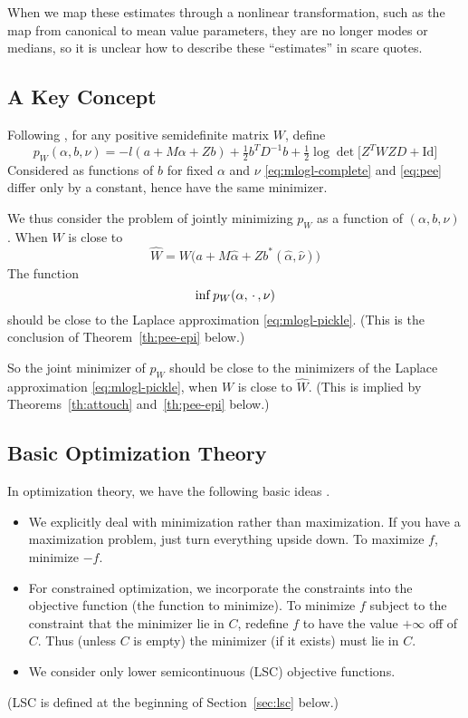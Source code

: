 When we map these estimates through a nonlinear transformation, such as the
map from canonical to mean value parameters,
they are no longer modes or medians, so it is unclear how to describe these
``estimates'' in scare quotes.

\subsection{A Key Concept}

Following \citet{reaster},
for any positive semidefinite matrix $W$, define
\begin{equation} \label{eq:pee}
   p_W(\alpha, b, \nu) =
   - l(a + M \alpha + Z b) + \tfrac{1}{2} b^T D^{-1} b
   + \tfrac{1}{2} \log \det \bigl[ Z^T W Z D + \text{Id}
   \bigr]
\end{equation}
Considered as functions of $b$ for fixed $\alpha$ and $\nu$
\eqref{eq:mlogl-complete} and \eqref{eq:pee} differ only by a constant,
hence have the same minimizer.

We thus consider the problem of jointly
minimizing $p_W$ as a function of $(\alpha, b, \nu)$.
When $W$ is close to
\begin{equation} \label{eq:w-hat}
   \widehat{W} =
   W\bigl(a + M \hat{\alpha} + Z b^*(\hat{\alpha}, \hat{\nu})\bigr)
\end{equation}
The function
$$
   \inf p_W(\alpha, \,\cdot\,, \nu)
$$
should be close to the Laplace approximation \eqref{eq:mlogl-pickle}.
(This is the conclusion of Theorem~\ref{th:pee-epi} below.)

So the joint minimizer of $p_W$ should be close to the minimizers
of the Laplace approximation \eqref{eq:mlogl-pickle},
when $W$ is close to $\hat{W}$.
(This is implied by Theorems~\ref{th:attouch} and~\ref{th:pee-epi} below.)

\subsection{Basic Optimization Theory}
\label{sec:basic}

In optimization theory, we have the following basic ideas
\citep[Sections~1.A, 1.B, and~1.C]{rockafellar-wets}.
\begin{itemize}
\item We explicitly deal with minimization rather than maximization.  If
    you have a maximization problem, just turn everything upside down.
    To maximize $f$, minimize $- f$.
\item For constrained optimization, we incorporate the constraints into
    the objective function (the function to minimize).
    To minimize $f$ subject to the constraint
    that the minimizer lie in $C$, redefine $f$ to have the value $+\infty$
    off of $C$.  Thus (unless $C$ is empty) the minimizer (if it exists)
    must lie in $C$.
\item We consider only lower semicontinuous (LSC) objective functions.
\end{itemize}
(LSC is defined at the beginning of Section~\ref{sec:lsc} below.)

